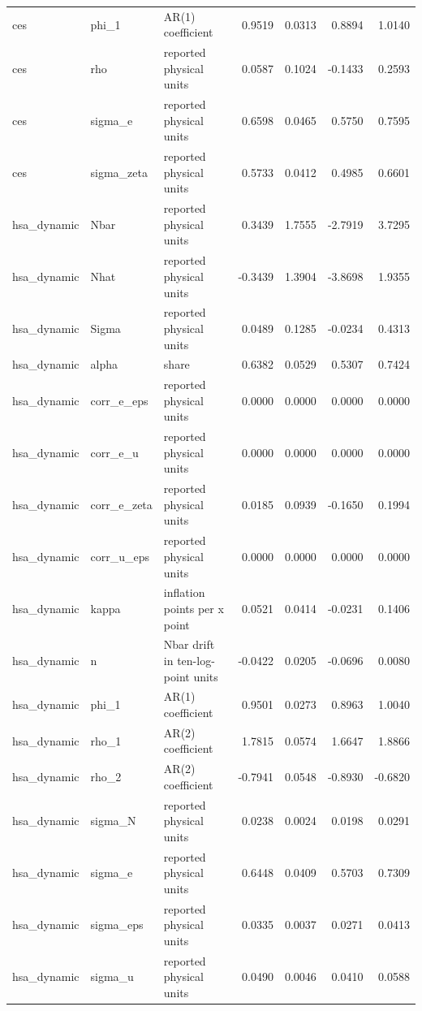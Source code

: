 \begin{tabular}{lllrrrr}
ces & phi\_1 & AR(1) coefficient & 0.9519 & 0.0313 & 0.8894 & 1.0140 \\
ces & rho & reported physical units & 0.0587 & 0.1024 & -0.1433 & 0.2593 \\
ces & sigma\_e & reported physical units & 0.6598 & 0.0465 & 0.5750 & 0.7595 \\
ces & sigma\_zeta & reported physical units & 0.5733 & 0.0412 & 0.4985 & 0.6601 \\
hsa\_dynamic & Nbar & reported physical units & 0.3439 & 1.7555 & -2.7919 & 3.7295 \\
hsa\_dynamic & Nhat & reported physical units & -0.3439 & 1.3904 & -3.8698 & 1.9355 \\
hsa\_dynamic & Sigma & reported physical units & 0.0489 & 0.1285 & -0.0234 & 0.4313 \\
hsa\_dynamic & alpha & share & 0.6382 & 0.0529 & 0.5307 & 0.7424 \\
hsa\_dynamic & corr\_e\_eps & reported physical units & 0.0000 & 0.0000 & 0.0000 & 0.0000 \\
hsa\_dynamic & corr\_e\_u & reported physical units & 0.0000 & 0.0000 & 0.0000 & 0.0000 \\
hsa\_dynamic & corr\_e\_zeta & reported physical units & 0.0185 & 0.0939 & -0.1650 & 0.1994 \\
hsa\_dynamic & corr\_u\_eps & reported physical units & 0.0000 & 0.0000 & 0.0000 & 0.0000 \\
hsa\_dynamic & kappa & inflation points per x point & 0.0521 & 0.0414 & -0.0231 & 0.1406 \\
hsa\_dynamic & n & Nbar drift in ten-log-point units & -0.0422 & 0.0205 & -0.0696 & 0.0080 \\
hsa\_dynamic & phi\_1 & AR(1) coefficient & 0.9501 & 0.0273 & 0.8963 & 1.0040 \\
hsa\_dynamic & rho\_1 & AR(2) coefficient & 1.7815 & 0.0574 & 1.6647 & 1.8866 \\
hsa\_dynamic & rho\_2 & AR(2) coefficient & -0.7941 & 0.0548 & -0.8930 & -0.6820 \\
hsa\_dynamic & sigma\_N & reported physical units & 0.0238 & 0.0024 & 0.0198 & 0.0291 \\
hsa\_dynamic & sigma\_e & reported physical units & 0.6448 & 0.0409 & 0.5703 & 0.7309 \\
hsa\_dynamic & sigma\_eps & reported physical units & 0.0335 & 0.0037 & 0.0271 & 0.0413 \\
hsa\_dynamic & sigma\_u & reported physical units & 0.0490 & 0.0046 & 0.0410 & 0.0588 \\

\end{tabular}
